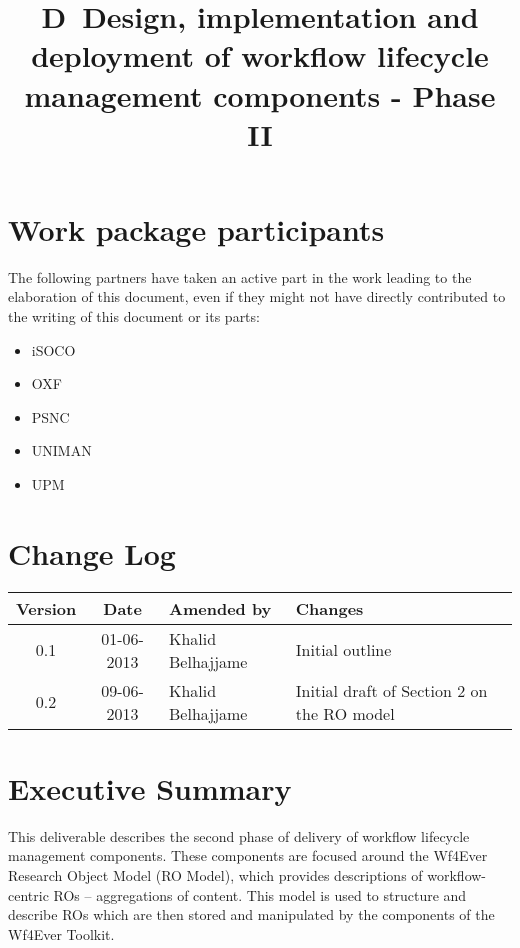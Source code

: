 \documentclass[a4paper, twoside, 11pt]{article}
\title{D\delid\ Design, implementation and deployment of workflow
  lifecycle management components - Phase II}
\begin{document}
\maketitle


\section*{Work package participants} The following partners have taken an active part in the work leading to the elaboration of this document, even if they might not have directly contributed to the writing of this document or its parts: %
\begin{itemize}
\item iSOCO
\item OXF
\item PSNC
\item UNIMAN
\item UPM
\end{itemize}

\section*{Change Log}
\begin{centering}

\begin{tabular}{|c|c|p{4.92cm}|p{6.5cm}|}

\hline \textbf{Version} & \textbf{Date} & \textbf{Amended by} & \textbf{Changes} \\ \hline
0.1 & 01-06-2013 & Khalid Belhajjame & Initial outline \\ \hline
0.2 & 09-06-2013 & Khalid Belhajjame & Initial draft of Section 2 on the RO model \\ \hline

\end{tabular}

\end{centering}
\clearpage
\section*{Executive Summary}
This deliverable describes the second phase of delivery of workflow
lifecycle management components. These components are focused around
the Wf4Ever Research Object Model (RO Model), which provides
descriptions of workflow-centric ROs -- aggregations of content. This
model is used to structure and describe ROs which are then stored and
manipulated by the components of the Wf4Ever Toolkit.
\end{document}
